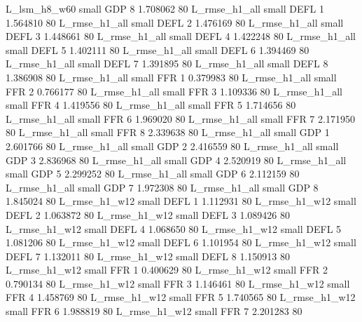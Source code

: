   L_lsm_h8_w60      small      GDP                 8 1.708062 80
 L_rmse_h1_all      small     DEFL                 1 1.564810 80
 L_rmse_h1_all      small     DEFL                 2 1.476169 80
 L_rmse_h1_all      small     DEFL                 3 1.448661 80
 L_rmse_h1_all      small     DEFL                 4 1.422248 80
 L_rmse_h1_all      small     DEFL                 5 1.402111 80
 L_rmse_h1_all      small     DEFL                 6 1.394469 80
 L_rmse_h1_all      small     DEFL                 7 1.391895 80
 L_rmse_h1_all      small     DEFL                 8 1.386908 80
 L_rmse_h1_all      small      FFR                 1 0.379983 80
 L_rmse_h1_all      small      FFR                 2 0.766177 80
 L_rmse_h1_all      small      FFR                 3 1.109336 80
 L_rmse_h1_all      small      FFR                 4 1.419556 80
 L_rmse_h1_all      small      FFR                 5 1.714656 80
 L_rmse_h1_all      small      FFR                 6 1.969020 80
 L_rmse_h1_all      small      FFR                 7 2.171950 80
 L_rmse_h1_all      small      FFR                 8 2.339638 80
 L_rmse_h1_all      small      GDP                 1 2.601766 80
 L_rmse_h1_all      small      GDP                 2 2.416559 80
 L_rmse_h1_all      small      GDP                 3 2.836968 80
 L_rmse_h1_all      small      GDP                 4 2.520919 80
 L_rmse_h1_all      small      GDP                 5 2.299252 80
 L_rmse_h1_all      small      GDP                 6 2.112159 80
 L_rmse_h1_all      small      GDP                 7 1.972308 80
 L_rmse_h1_all      small      GDP                 8 1.845024 80
 L_rmse_h1_w12      small     DEFL                 1 1.112931 80
 L_rmse_h1_w12      small     DEFL                 2 1.063872 80
 L_rmse_h1_w12      small     DEFL                 3 1.089426 80
 L_rmse_h1_w12      small     DEFL                 4 1.068650 80
 L_rmse_h1_w12      small     DEFL                 5 1.081206 80
 L_rmse_h1_w12      small     DEFL                 6 1.101954 80
 L_rmse_h1_w12      small     DEFL                 7 1.132011 80
 L_rmse_h1_w12      small     DEFL                 8 1.150913 80
 L_rmse_h1_w12      small      FFR                 1 0.400629 80
 L_rmse_h1_w12      small      FFR                 2 0.790134 80
 L_rmse_h1_w12      small      FFR                 3 1.146461 80
 L_rmse_h1_w12      small      FFR                 4 1.458769 80
 L_rmse_h1_w12      small      FFR                 5 1.740565 80
 L_rmse_h1_w12      small      FFR                 6 1.988819 80
 L_rmse_h1_w12      small      FFR                 7 2.201283 80
